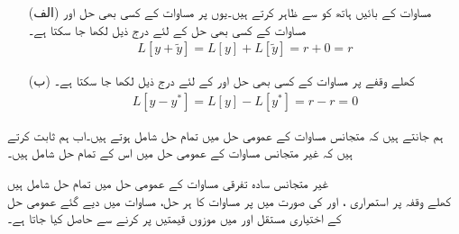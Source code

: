 \begin{enumerate}
\item[(الف)]
مساوات  کے بائیں ہاتھ کو  سے ظاہر کرتے ہیں۔یوں   پر مساوات  کے کسی بھی حل  اور مساوات  کے کسی بھی حل  کے لئے درج ذیل لکھا جا سکتا ہے۔
\begin{align*}
L[y+\tilde{y}]=L[y]+L[\tilde{y}]=r+0=r
\end{align*}
\item[(ب)]
کھلے وقفے  پر مساوات  کے کسی بھی حل  اور  کے لئے درج ذیل لکھا جا سکتا ہے۔
\begin{align*}
L[y-y^*]=L[y]-L[y^*]=r-r=0
\end{align*}
\end{enumerate}

ہم جانتے ہیں کہ متجانس مساوات  کے عمومی حل میں تمام حل شامل ہوتے ہیں۔اب ہم ثابت کرتے ہیں کہ غیر متجانس مساوات  کے عمومی حل میں اس کے تمام حل شامل ہیں۔

\quad غیر متجانس سادہ تفرقی مساوات کے عمومی حل میں تمام حل شامل ہیں\\
کھلے وقفہ  پر استمراری ،  اور  کی صورت میں  پر مساوات  کا ہر حل،  مساوات  میں دیے گئے عمومی حل کے اختیاری مستقل  اور  میں موزوں قیمتیں پر کرنے سے حاصل کیا جاتا ہے۔ 

